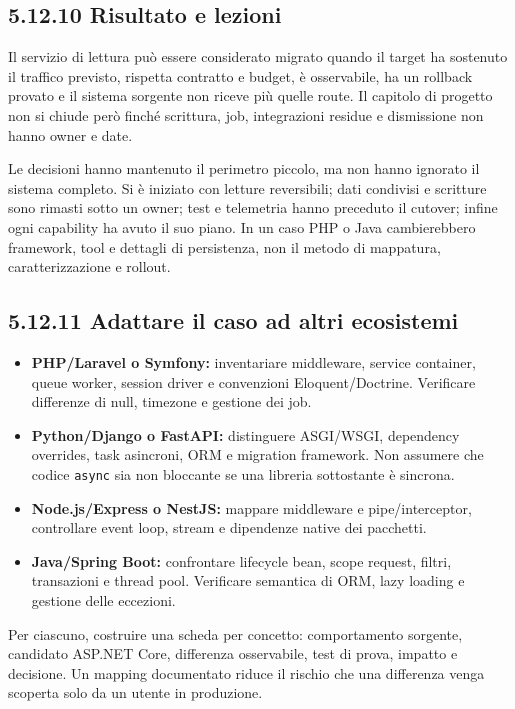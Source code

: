\documentclass[
  italian,
  10pt,
]{book}
\providecommand{\tightlist}{%
  \setlength{\itemsep}{0pt}\setlength{\parskip}{0pt}}
\begin{document}
\subsection{5.12.10 Risultato e lezioni}\label{risultato-e-lezioni}

Il servizio di lettura può essere considerato migrato quando il target
ha sostenuto il traffico previsto, rispetta contratto e budget, è
osservabile, ha un rollback provato e il sistema sorgente non riceve più
quelle route. Il capitolo di progetto non si chiude però finché
scrittura, job, integrazioni residue e dismissione non hanno owner e
date.

Le decisioni hanno mantenuto il perimetro piccolo, ma non hanno ignorato
il sistema completo. Si è iniziato con letture reversibili; dati
condivisi e scritture sono rimasti sotto un owner; test e telemetria
hanno preceduto il cutover; infine ogni capability ha avuto il suo
piano. In un caso PHP o Java cambierebbero framework, tool e dettagli di
persistenza, non il metodo di mappatura, caratterizzazione e rollout.

\subsection{5.12.11 Adattare il caso ad altri
ecosistemi}\label{adattare-il-caso-ad-altri-ecosistemi}

\begin{itemize}
\tightlist
\item
  \textbf{PHP/Laravel o Symfony:} inventariare middleware, service
  container, queue worker, session driver e convenzioni
  Eloquent/Doctrine. Verificare differenze di null, timezone e gestione
  dei job.
\item
  \textbf{Python/Django o FastAPI:} distinguere ASGI/WSGI, dependency
  overrides, task asincroni, ORM e migration framework. Non assumere che
  codice \texttt{async} sia non bloccante se una libreria sottostante è
  sincrona.
\item
  \textbf{Node.js/Express o NestJS:} mappare middleware e
  pipe/interceptor, controllare event loop, stream e dipendenze native
  dei pacchetti.
\item
  \textbf{Java/Spring Boot:} confrontare lifecycle bean, scope request,
  filtri, transazioni e thread pool. Verificare semantica di ORM, lazy
  loading e gestione delle eccezioni.
\end{itemize}

Per ciascuno, costruire una scheda per concetto: comportamento sorgente,
candidato ASP.NET Core, differenza osservabile, test di prova, impatto e
decisione. Un mapping documentato riduce il rischio che una differenza
venga scoperta solo da un utente in produzione.
\end{document}
